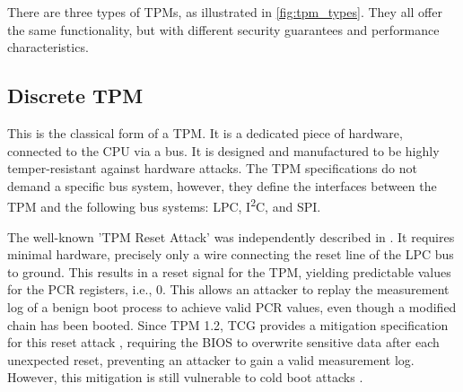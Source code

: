 


There are three types of TPMs, as illustrated in \autoref{fig:tpm_types}. They all offer the same functionality, but with different security guarantees and performance characteristics.

\subsection{Discrete TPM}

This is the classical form of a TPM. It is a dedicated piece of hardware, connected to the CPU via a bus. It is designed and manufactured to be highly temper-resistant against hardware attacks.
The TPM specifications \cite{tpm, tcgPcClient} do not demand a specific bus system, however, they define the interfaces between the TPM and the following bus systems: LPC, I\textsuperscript{2}C, and SPI.

The well-known 'TPM Reset Attack' was independently described in \cite{kauerBernhard,sparks2007}. It requires minimal hardware, precisely only a wire connecting the reset line of the LPC bus \cite{lpc} to ground. This results in a reset signal for the TPM, yielding predictable values for the \ac{PCR} registers, i.e., 0. This allows an attacker to replay the measurement log of a benign boot process to achieve valid \ac{PCR} values, even though a modified chain has been booted.
Since TPM 1.2, TCG provides a mitigation specification for this reset attack \cite{tcgResetFix}, requiring the BIOS to overwrite sensitive data after each unexpected reset, preventing an attacker to gain a valid measurement log.
However, this mitigation is still vulnerable to cold boot attacks \cite{Halderman2009, Winter2013}.

